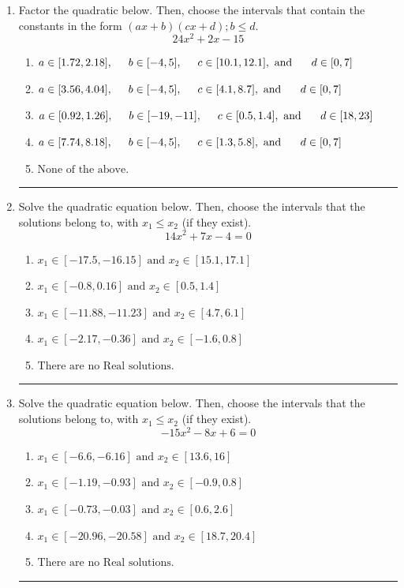 \documentclass[14pt]{extbook}
\newcommand{\litem}[1]{\item#1\hspace*{-1cm}\rule{\textwidth}{0.4pt}}
\begin{document}
\begin{enumerate}
{\begin{enumerate}[label=\Alph*.]
\end{enumerate} }
\litem{
Factor the quadratic below. Then, choose the intervals that contain the constants in the form $(ax+b)(cx+d); b \leq d.$\[ 24x^{2} +2 x -15 \]\begin{enumerate}[label=\Alph*.]
\item \( a \in [1.72, 2.18], \hspace*{5mm} b \in [-4, 5], \hspace*{5mm} c \in [10.1, 12.1], \text{ and } \hspace*{5mm} d \in [0, 7] \)
\item \( a \in [3.56, 4.04], \hspace*{5mm} b \in [-4, 5], \hspace*{5mm} c \in [4.1, 8.7], \text{ and } \hspace*{5mm} d \in [0, 7] \)
\item \( a \in [0.92, 1.26], \hspace*{5mm} b \in [-19, -11], \hspace*{5mm} c \in [0.5, 1.4], \text{ and } \hspace*{5mm} d \in [18, 23] \)
\item \( a \in [7.74, 8.18], \hspace*{5mm} b \in [-4, 5], \hspace*{5mm} c \in [1.3, 5.8], \text{ and } \hspace*{5mm} d \in [0, 7] \)
\item \( \text{None of the above.} \)

\end{enumerate} }
\litem{
Solve the quadratic equation below. Then, choose the intervals that the solutions belong to, with $x_1 \leq x_2$ (if they exist).\[ 14x^{2} +7 x -4 = 0 \]\begin{enumerate}[label=\Alph*.]
\item \( x_1 \in [-17.5, -16.15] \text{ and } x_2 \in [15.1, 17.1] \)
\item \( x_1 \in [-0.8, 0.16] \text{ and } x_2 \in [0.5, 1.4] \)
\item \( x_1 \in [-11.88, -11.23] \text{ and } x_2 \in [4.7, 6.1] \)
\item \( x_1 \in [-2.17, -0.36] \text{ and } x_2 \in [-1.6, 0.8] \)
\item \( \text{There are no Real solutions.} \)

\end{enumerate} }
\litem{
Solve the quadratic equation below. Then, choose the intervals that the solutions belong to, with $x_1 \leq x_2$ (if they exist).\[ -15x^{2} -8 x + 6 = 0 \]\begin{enumerate}[label=\Alph*.]
\item \( x_1 \in [-6.6, -6.16] \text{ and } x_2 \in [13.6, 16] \)
\item \( x_1 \in [-1.19, -0.93] \text{ and } x_2 \in [-0.9, 0.8] \)
\item \( x_1 \in [-0.73, -0.03] \text{ and } x_2 \in [0.6, 2.6] \)
\item \( x_1 \in [-20.96, -20.58] \text{ and } x_2 \in [18.7, 20.4] \)
\item \( \text{There are no Real solutions.} \)


\end{enumerate}}
\end{enumerate}
\end{document}
